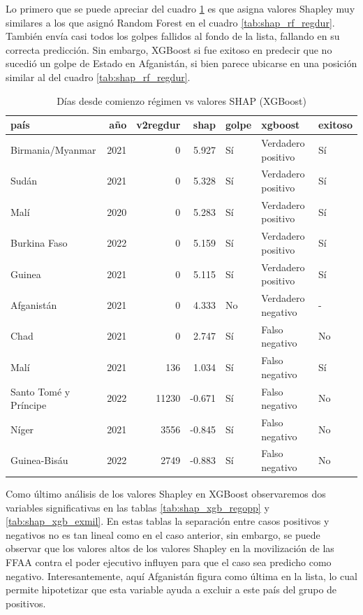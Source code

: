\documentclass{article}
\begin{document}
Lo primero que se puede apreciar del cuadro \ref{tab:shap_xgb_regdur} es que asigna valores Shapley
muy similares a los que asignó Random Forest en el cuadro \ref{tab:shap_rf_regdur}. También envía casi
todos los golpes fallidos al fondo de la lista, fallando en su correcta predicción. Sin embargo,
XGBoost si fue exitoso en predecir que no sucedió un golpe de Estado en Afganistán, si bien parece
ubicarse en una posición similar al del cuadro \ref{tab:shap_rf_regdur}.

\begin{table}[H]
  \centering
  \begin{tabular}{lrrrlll}
    \toprule
    país & año & v2regdur & shap & golpe & xgboost & exitoso \\
    \midrule
    Birmania/Myanmar & 2021 & 0 & 5.927 & Sí & Verdadero positivo & Sí \\
    Sudán & 2021 & 0 & 5.328 & Sí & Verdadero positivo & Sí \\
    Malí & 2020 & 0 & 5.283 & Sí & Verdadero positivo & Sí \\
    Burkina Faso & 2022 & 0 & 5.159 & Sí & Verdadero positivo & Sí \\
    Guinea & 2021 & 0 & 5.115 & Sí & Verdadero positivo & Sí \\
    Afganistán & 2021 & 0 & 4.333 & No & Verdadero negativo & - \\
    Chad & 2021 & 0 & 2.747 & Sí & Falso negativo & No \\
    Malí & 2021 & 136 & 1.034 & Sí & Falso negativo & Sí \\
    Santo Tomé y Príncipe & 2022 & 11230 & -0.671 & Sí & Falso negativo & No \\
    Níger & 2021 & 3556 & -0.845 & Sí & Falso negativo & No \\
    Guinea-Bisáu & 2022 & 2749 & -0.883 & Sí & Falso negativo & No \\
    \bottomrule
    \end{tabular}
    \caption{Días desde comienzo régimen vs valores SHAP (XGBoost) \label{tab:shap_xgb_regdur}}
  \end{table}

Como último análisis de los valores Shapley en XGBoost observaremos dos variables significativas en
las tablas \ref{tab:shap_xgb_regopp} y \ref{tab:shap_xgb_exmil}. En estas tablas la separación entre
casos positivos y negativos no es tan lineal como en el caso anterior, sin embargo, se puede observar
que los valores altos de los valores Shapley en la movilización de las FFAA contra el poder ejecutivo
influyen para que el caso sea predicho como negativo. Interesantemente, aquí Afganistán figura como 
última en la lista, lo cual permite hipotetizar que esta variable ayuda a excluir a este país del grupo
de positivos.
\end{document}

